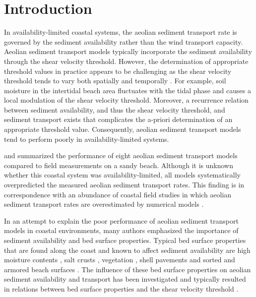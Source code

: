 \section{Introduction}

In availability-limited coastal systems, the aeolian sediment
transport rate is governed by the sediment availability rather than
the wind transport capacity. Aeolian sediment transport models
typically incorporate the sediment availability through the shear
velocity threshold. However, the determination of appropriate
threshold values in practice appears to be challenging as the shear
velocity threshold tends to vary both spatially and temporally
\citep{Barchyn2014b}. For example, soil moisture in the intertidal
beach area fluctuates with the tidal phase and causes a local
modulation of the shear velocity threshold. Moreover, a recurrence
relation between sediment availability, and thus the shear velocity
threshold, and sediment transport exists that complicates the a-priori
determination of an appropriate threshold value. Consequently, aeolian
sediment transport models tend to perform poorly in
availability-limited systems.

\citet{Sherman1998} and \citet{Sherman2012} summarized the performance
of eight aeolian sediment transport models compared to field
measurements on a sandy beach. Although it is unknown whether this
coastal system was availability-limited, all models systematically
overpredicted the measured aeolian sediment transport rates. This
finding is in correspondence with an abundance of coastal field
studies in which aeolian sediment transport rates are overestimated by
numerical models \citep[e.g.][]{Jackson1999, Lynch2008,
  DavidsonArnott2009, Aagaard2014}.

In an attempt to explain the poor performance of aeolian sediment
transport models in coastal environments, many authors emphasized the
importance of sediment availability and bed surface
properties. Typical bed surface properties that are found along the
coast and known to affect sediment availability are high moisture
contents \citep[e.g.][]{Wiggs2004, DavidsonArnott2008, Darke2008,
  McKennaNeuman2008, Udo2008, Bauer2009, Edwards2009, Namikas2010,
  Scheidt2010}, salt crusts \citep[e.g.][]{Nickling1981}, vegetation
\citep[e.g.][]{Arens1996, Lancaster1998, Okin2008, Li2013,
  Dupont2014}, shell pavements \citep[e.g.][]{VanDerWal1998,
  McKennaNeuman2012} and sorted and armored beach surfaces
\citep[e.g.][]{Gillette1989, Gillies2006, Tan2013, Cheng2015}. The
influence of these bed surface properties on aeolian sediment
availability and transport has been investigated and typically
resulted in relations between bed surface properties and the shear
velocity threshold \citep[e.g.][]{Howard1977, Dyer1986, Belly1964,
  Johnson1965, Hotta1984, Nickling1981, Arens1996, King2005}.

